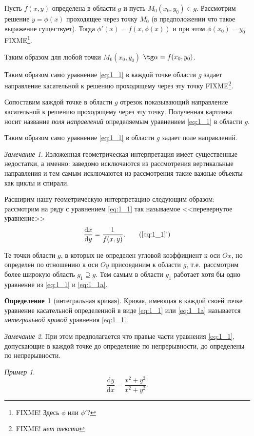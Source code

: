 \documentclass[a4paper,10pt]{report}
\newcommand{\ud}{\mathrm{d}}
\newcommand{\new}[2]{\emph{#1}\index{#2}}
\theoremstyle{definition}
\newtheorem{definition}{Определение}[section]
\theoremstyle{remark}
\newtheorem{note}{Замечание}[section]
\newtheorem{example}{Пример}[section]
\theoremstyle{plain}
\begin{document}
Пусть $f(x,y)$ определена в области $g$ и пусть $M_0(x_0,y_0) \in g$. Рассмотрим решение $y = \phi(x)$ проходящее через точку $M_0$ (в предположении что такое выражение существует). Тогда $\phi'(x) = f(x, \phi(x))$ и при этом $\phi(x_0) = y_0$ FIXME\footnote{FIXME! Здесь $\phi$ или $\phi'$?}.

Таким образом для любой точки $M_0(x_0,y_0)$ $\tg \alpha = f(x_0,y_0)$.

Таким образом само уравнение \eqref{eq:1_1} в каждой точке области $g$ задает направление касательной к решению проходящему через эту точку FIXME\footnote{FIXME! \emph{нет текста}}.

Сопоставим каждой точке в области $g$ отрезок показывающий направление касательной к решению проходящему через эту точку. Полученная картинка носит название \new{поля направлений}{Поле направлений} определяемым уравнением \eqref{eq:1_1} в области $g$.

Таким образом само уравнение \eqref{eq:1_1} в области $g$ задает поле направлений.

\begin{note}
 Изложенная геометрическая интерпретация имеет существенные недостатки, а именно: заведомо исключаются из рассмотрения вертикальные направления и тем самым исключаются из рассмотрения такие важные объекты как циклы и спирали.
\end{note}

Расширим нашу геометрическую интерпретацию следующим образом: рассмотрим на ряду с уравнением \eqref{eq:1_1} так называемое <<перевернутое уравнение>>
\begin{equation}
 \frac{\ud x}{\ud y} = \frac{1}{f(x,y)}. \tag{\ref{eq:1_1}'}
 \label{eq:1_1a}
\end{equation}

Те точки области $g$, в которых не определен угловой коэффициент к оси $Ox$, но определен по отношению к оси $Oy$ присоединим к области $g$, т.е.\ рассмотрим более широкую область $g_1 \supseteq g$. Тем самым в области $g_1$ работает хотя бы одно уравнение из \eqref{eq:1_1} и \eqref{eq:1_1a}.

\begin{definition}[интегральная кривая]
 Кривая, имеющая в каждой своей точке уравнение касательной определенной в виде \eqref{eq:1_1} или \eqref{eq:1_1a} называется \new{интегральной кривой}{Интегральная кривая} уравнения \eqref{eq:1_1}.
\end{definition}

\begin{note}
 При этом предполагается что правые части уравнения \eqref{eq:1_1}, допускающие в каждой точке до определение по непрерывности, до определены по непрерывности.
 \begin{example}
  $$\frac{\ud y}{\ud x} = \frac{x^2+y^2}{x^2+y^2}.$$
 \end{example}
\end{note}
\end{document}
